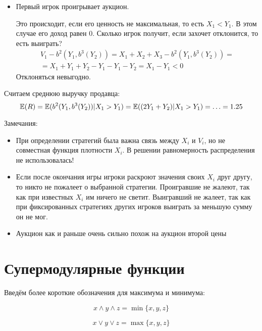 \begin{myex}
\begin{itemize}
\item Первый игрок проигрывает аукцион.

Это происходит, если его ценность не максимальная, то есть $ X_{1}<Y_{1} $. В этом случае его доход равен 0. Сколько игрок получит, если захочет отклонится, то есть выиграть?
\begin{multline}
 V_{1}-b^{2}(Y_{1},b^{3}(Y_{2}))=X_{1}+X_{2}+X_{3}-b^{2}(Y_{1},b^{3}(Y_{2}))=\\
 =X_{1}+Y_{1}+Y_{2}-Y_{1}-Y_{1}-Y_{2}=X_{1}-Y_{1}<0
\end{multline}
Отклоняться невыгодно.
\end{itemize}


Считаем среднюю выручку продавца:
\begin{equation}
\operatorname{\mathbb{E}}(R)=\operatorname{\mathbb{E}}(b^{2}(Y_{1},b^{3}(Y_{2}))|X_{1}>Y_{1})=\operatorname{\mathbb{E}}((2Y_{1}+Y_{2})|X_{1}>Y_{1})=\ldots=1.25
\end{equation}

Замечания:
\begin{itemize}
\item При определении стратегий была важна связь между $ X_{i} $ и $ V_{i} $, но не совместная функция плотности $ X_{i} $. В решении равномерность распределения не использовалась!
\item Если после окончания игры игроки раскроют значения своих $ X_{i} $ друг другу, то никто не пожалеет о выбранной стратегии. Проигравшие не жалеют, так как при известных $ X_{i} $ им ничего не светит. Выигравший не жалеет, так как при фиксированных стратегиях других игроков выиграть за меньшую сумму он не мог.
\item Аукцион как и раньше очень сильно похож на аукцион второй цены
\end{itemize}




\end{myex}



\section{Супермодулярные функции}

Введём более короткие обозначения для максимума и минимума:

\begin{equation}
x\wedge y\wedge z =\min\{x,y,z\}
\end{equation}

\begin{equation}
x\vee y\vee z =\max\{x,y,z\}
\end{equation}

